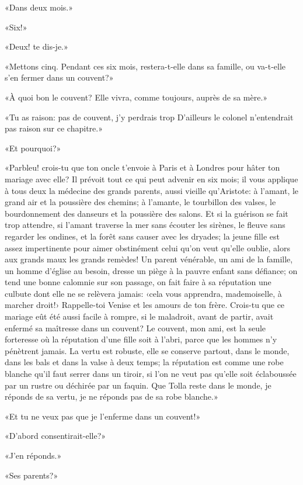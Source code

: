 «Dans deux mois.»

«Six!»

«Deux! te dis-je.»

«Mettons cinq. Pendant ces six mois, restera-t-elle dans sa famille, ou va-t-elle s'en fermer dans un couvent?»

«À quoi bon le couvent? Elle vivra, comme toujours, auprès de sa mère.»

«Tu as raison: pas de couvent, j'y perdrais trop D'ailleurs le colonel n'entendrait pas raison sur ce chapitre.»

«Et pourquoi?»

«Parbleu! crois-tu que ton oncle t'envoie à Paris et à Londres pour hâter ton mariage avec elle? Il prévoit tout ce qui peut advenir en six mois; il vous applique à tous deux la médecine des grands parents, aussi vieille qu'Aristote: à l'amant, le grand air et la poussière des chemins; à l'amante, le tourbillon des valses, le bourdonnement des danseurs et la poussière des salons. Et si la guérison se fait trop attendre, si l'amant traverse la mer sans écouter les sirènes, le fleuve sans regarder les ondines, et la forêt sans causer avec les dryades; la jeune fille est assez impertinente pour aimer obstinément celui qu'on veut qu'elle oublie, alors aux grands maux les grands remèdes! Un parent vénérable, un ami de la famille, un homme d'église au besoin, dresse un piège à la pauvre enfant sans défiance; on tend une bonne calomnie sur son passage, on fait faire à sa réputation une culbute dont elle ne se relèvera jamais: ‹cela vous apprendra, mademoiselle, à marcher droit!› Rappelle-toi Venise et les amours de ton frère. Crois-tu que ce mariage eût été aussi facile à rompre, si le maladroit, avant de partir, avait enfermé sa maîtresse dans un couvent? Le couvent, mon ami, est la seule forteresse où la réputation d'une fille soit à l'abri, parce que les hommes n'y pénètrent jamais. La vertu est robuste, elle se conserve partout, dans le monde, dans les bals et dans la valse à deux temps; la réputation est comme une robe blanche qu'il faut serrer dans un tiroir, si l'on ne veut pas qu'elle soit éclaboussée par un rustre ou déchirée par un faquin. Que Tolla reste dans le monde, je réponds de sa vertu, je ne réponds pas de sa robe blanche.»

«Et tu ne veux pas que je l'enferme dans un couvent!»

«D'abord consentirait-elle?»

«J'en réponds.»

«Ses parents?»

